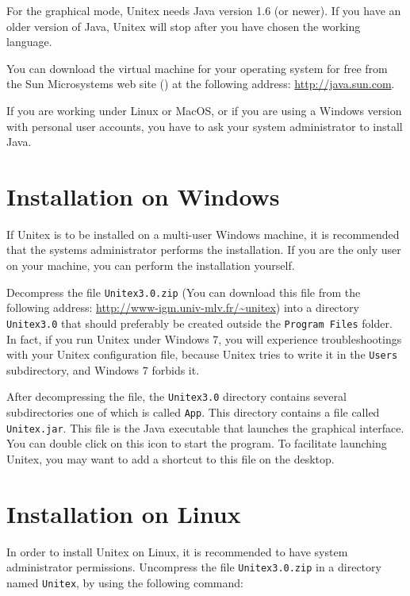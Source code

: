 \bigskip
\noindent For the graphical mode, Unitex needs Java version 1.6 (or newer). If you have an
older version of Java, Unitex will stop after you have chosen the working
language.

\bigskip
\noindent You can download the virtual machine for your operating system for free from the
Sun Microsystems web site (\cite{site-java}) at the following address:
\url{http://java.sun.com}.

\bigskip
\noindent If you are working under Linux or MacOS, or if you are using a Windows version
with personal user accounts, you have to ask your system administrator to install
Java.


\section{Installation on Windows}
If Unitex is to be installed on a multi-user Windows machine, it is recommended
that the systems administrator performs the installation. If you are the only
user on your machine, you can perform the installation  yourself.

\bigskip
\noindent Decompress the file  \verb+Unitex3.0.zip+ (You
can download this file from the following address:
\url{http://www-igm.univ-mlv.fr/~unitex}) into a directory \verb+Unitex3.0+ that
should preferably be created outside the \verb+Program Files+ folder. In fact, if you
run Unitex under Windows 7, you will experience troubleshootings with your Unitex configuration
file, because Unitex tries to write it in the \verb+Users+ subdirectory, and Windows 7
forbids it.

\bigskip
\noindent After decompressing the file, the \verb+Unitex3.0+ directory contains several
subdirectories  one  of which is called \verb+App+. This directory contains a
file called \verb+Unitex.jar+.  This file is the
Java executable that launches the graphical interface. You can double click on
this icon to start the program. To facilitate launching Unitex, you may want to
add a shortcut to this file on the desktop.




\section{Installation on Linux}
In order to install Unitex on Linux, it is recommended to have system
administrator permissions. Uncompress the file \verb+Unitex3.0.zip+ in a
directory named \verb+Unitex+, by using the following command:


